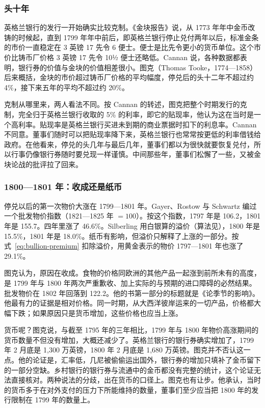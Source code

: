 \subsubsection{头十年}
英格兰银行的发行一开始确实比较克制。《金块报告》说，从 1773 年年中金币改铸的时候起，直到 1799 年年中前后，即英格兰银行停止兑付两年以后，标准金条的市价一直稳定在 3 英镑 17 先令 6 便士\cite{bullion1810}。便士是比先令更小的货币单位。这个市价比铸币厂价格 3 英镑 17 先令 10½ 便士还略低。Cannan 说，各种数据都表明，银行券的价值与金块的价值相差很小\cite{cannan1919}。图克（Thomas Tooke，1774—1858）后来概括，金块的市价超过铸币厂价格的平均幅度，停兑后的头十二年不超过约 4\%，接下来五年的平均不超过约 20\%\cite{tooke1838}。

克制从哪里来，两人看法不同。按 Cannan 的转述，图克把整个时期发行的克制，完全归于英格兰银行收取的 5\% 的利率，即它的贴现率，他认为这在当时是一个高利率\cite{cannan1919}。贴现率是英格兰银行买进未到期的商业票据时扣下的利息率。Cannan 不同意。董事们随时可以把贴现率降下来，英格兰银行也常常按更低的利率借钱给政府。在他看来，停兑的头几年与最后几年，董事们都以为很快就要恢复兑付，所以行事仍像银行券随时要兑现一样谨慎。中间那些年，董事们松懈了一些，又被金块论战的批评拉了回来\cite{cannan1919}。

\subsubsection{1800—1801 年：收成还是纸币}
停兑以后的第一次物价大涨在 1799—1801 年。Gayer、Rostow 与 Schwartz 编过一个批发物价指数（1821—1825 年 $=100$）。按这个指数，1797 年是 106.2，1801 年是 155.7。四年里涨了 46.6\%\cite{gayer1953,boe2017}。Silberling 用白银算的溢价（算法见），1800 年是 15.5\%，1801 年是 18.0\%\cite{silberling1919}。纸币有影响，但溢价只解释了上涨的一部分。按式~\eqref{eq:bullion-premium} 扣除溢价，用黄金表示的物价 1797—1801 年也涨了 29.1\%。

图克认为，原因在收成。食物的价格同欧洲的其他产品一起涨到前所未有的高度，是 1799 年与 1800 年两次严重歉收、加上实际的与预期的进口障碍的必然结果\cite{tooke1838}。批发物价在 1802 年回落到 122.2\cite{gayer1953}。他的书第一部分的标题就是《论季节的影响》\cite{tooke1838}。他最有力的证据是相对价格。同一时期，从大西洋彼岸运来的一切产品，价格都大幅下跌；如果原因只是货币增加，这些价格也应当上涨\cite{tooke1838}。

货币呢？图克说，与截至 1795 年的三年相比，1799 年与 1800 年物价高涨期间的货币数量不但没有增加，大概还减少了\cite{tooke1838}。英格兰银行的银行券确实增加了，1799 年 2 月底是 1,300 万英镑，1800 年 2 月底是 1,680 万英镑\cite{cannan1919}。图克并不否认这一点。他的论证是，汇率低，几尼被偷偷运出国外，银行券的增加只填补了金币留下的一部分空缺\cite{tooke1838}。乡村银行的银行券与流通中的金币都没有完整的统计，这个论证无法直接核对。两种说法的分歧，出在货币的口径上。图克也有让步。他承认，当时的货币多于在对外支付的压力下所能维持的数量，董事们至少应当把 1800 年的发行限制在 1799 年的数量上\cite{tooke1838}。

